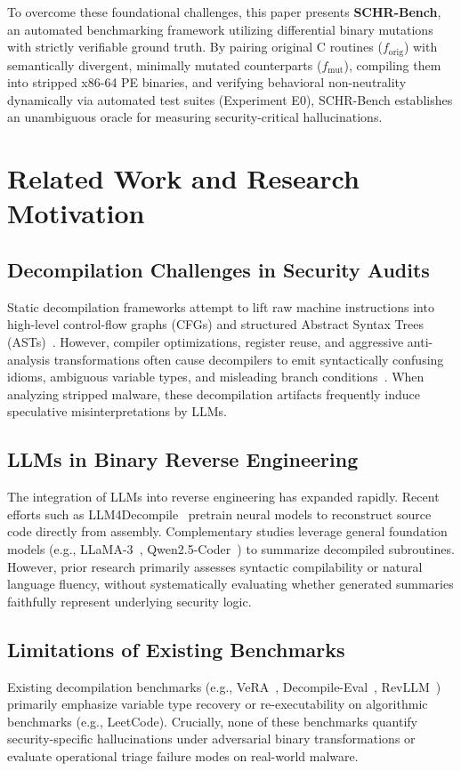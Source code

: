 \documentclass[conference]{IEEEtran}
\begin{document}
To overcome these foundational challenges, this paper presents \textbf{SCHR-Bench}, an automated benchmarking framework utilizing differential binary mutations with strictly verifiable ground truth. By pairing original C routines ($f_{\text{orig}}$) with semantically divergent, minimally mutated counterparts ($f_{\text{mut}}$), compiling them into stripped x86-64 PE binaries, and verifying behavioral non-neutrality dynamically via automated test suites (Experiment E0), SCHR-Bench establishes an unambiguous oracle for measuring security-critical hallucinations.

\section{Related Work and Research Motivation}

\subsection{Decompilation Challenges in Security Audits}
Static decompilation frameworks attempt to lift raw machine instructions into high-level control-flow graphs (CFGs) and structured Abstract Syntax Trees (ASTs)~\cite{yakdan2015norepdb}. However, compiler optimizations, register reuse, and aggressive anti-analysis transformations often cause decompilers to emit syntactically confusing idioms, ambiguous variable types, and misleading branch conditions~\cite{schwarz2002disassembly,cifuentes1995decompilation}. When analyzing stripped malware, these decompilation artifacts frequently induce speculative misinterpretations by LLMs.

\subsection{LLMs in Binary Reverse Engineering}
The integration of LLMs into reverse engineering has expanded rapidly. Recent efforts such as LLM4Decompile~\cite{sun2024llm4decompile} pretrain neural models to reconstruct source code directly from assembly. Complementary studies leverage general foundation models (e.g., LLaMA-3~\cite{dubey2024llama3}, Qwen2.5-Coder~\cite{hui2024qwen25coder}) to summarize decompiled subroutines. However, prior research primarily assesses syntactic compilability or natural language fluency, without systematically evaluating whether generated summaries faithfully represent underlying security logic.

\subsection{Limitations of Existing Benchmarks}
Existing decompilation benchmarks (e.g., VeRA~\cite{alrabaee2022vera}, Decompile-Eval~\cite{decompileeval2024}, RevLLM~\cite{revllm2024}) primarily emphasize variable type recovery or re-executability on algorithmic benchmarks (e.g., LeetCode). Crucially, none of these benchmarks quantify security-specific hallucinations under adversarial binary transformations or evaluate operational triage failure modes on real-world malware.
\end{document}
